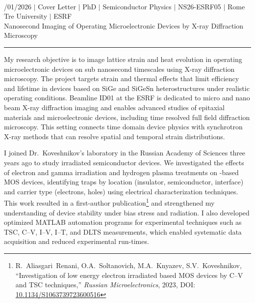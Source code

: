 \documentclass[a4paper,12pt]{article}
\begin{document}
{\centering
  {\scshape {}} \\ 
  {\fontsize{10}{10}/01/2026} $|$
  {\fontsize{10}{10}\selectfont Cover Letter} $|$
  {\fontsize{10}{10}\selectfont PhD} $|$
  {\fontsize{10}{10}\selectfont Semiconductor Physics} $|$
  {\fontsize{10}{10}\selectfont NS26-ESRF05} $|$
  {\fontsize{10}{10}\selectfont Rome Tre University} $|$
  {\fontsize{10}{10}\selectfont ESRF} \\
  {\fontsize{10}{10}\selectfont Nanosecond Imaging of Operating Microelectronic Devices by X-ray Diffraction Microscopy}
\par}
\vspace{-15pt}
\noindent\rule{\textwidth}{0.5pt}

\vspace{-5pt}

My research objective is to image lattice strain and heat evolution in operating microelectronic devices on sub nanosecond timescales using X-ray diffraction microscopy. The project targets strain and thermal effects that limit efficiency and lifetime in devices based on SiGe and SiGeSn heterostructures under realistic operating conditions. Beamline ID01 at the ESRF is dedicated to micro and nano beam X-ray diffraction imaging and enables advanced studies of epitaxial materials and microelectronic devices, including time resolved full field diffraction microscopy. This setting connects time domain device physics with synchrotron X-ray methods that can resolve spatial and temporal strain distributions.

I joined Dr.\ Koveshnikov's laboratory in the Russian Academy of Sciences three years ago to study irradiated semiconductor devices. We investigated the effects of electron and gamma irradiation and hydrogen plasma treatments on -based MOS devices, identifying traps by location (insulator, semiconductor, interface) and carrier type (electrons, holes) using electrical characterization techniques. This work resulted in a first-author publication\footnote{R.~Aliasgari~Renani, O.A.~Soltanovich, M.A.~Knyazev, S.V.~Koveshnikov, ``Investigation of low energy electron irradiated  based MOS devices by C--V and TSC techniques,'' \textit{Russian Microelectronics}, 2023, DOI: \href{https://doi.org/10.1134/S1063739723600516}{10.1134/S1063739723600516}} and strengthened my understanding of device stability under bias stress and radiation. I also developed optimized MATLAB automation programs for experimental techniques such as TSC, C--V, I--V, I--T, and DLTS measurements, which enabled systematic data acquisition and reduced experimental run-times.
\end{document}
